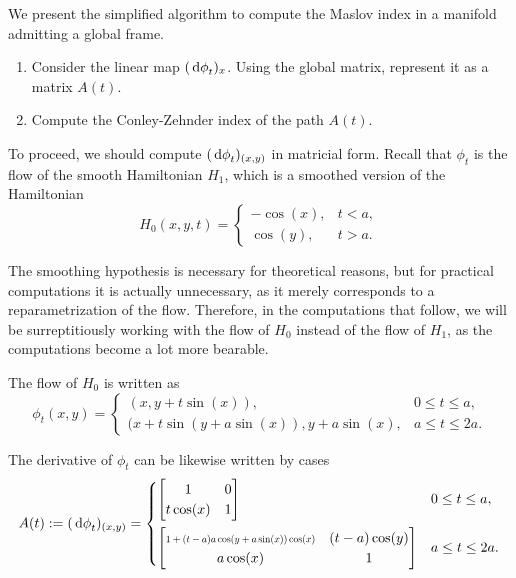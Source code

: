 \documentclass{article}
\theoremstyle{nonumberplain}
\begin{document}
We present the simplified algorithm to compute the Maslov index in a manifold admitting a global frame.
\begin{enumerate}[algorithm]\label{page:maslovalg2}
\item Consider the linear map $(\dl \phi_t)_x$. Using the global matrix, represent it as a matrix $A(t)$.
\item Compute the Conley-Zehnder index of the path $A(t)$.
\end{enumerate}

To proceed, we should compute $(\dl \phi_t)_{(x,y)}$ in matricial form. Recall that $\phi_t$ is the flow of the smooth Hamiltonian $H_1$, which is a smoothed version of the Hamiltonian
\begin{equation}
H_0(x,y,t) = \begin{cases}
-\cos(x), & t < a,\\
\cos(y), & t > a.
\end{cases}
\end{equation}

The smoothing hypothesis is necessary for theoretical reasons, but for practical computations it is actually unnecessary, as it merely corresponds to a reparametrization of the flow. Therefore, in the computations that follow, we will be surreptitiously working with the flow of $H_0$ instead of the flow of $H_1$, as the computations become a lot more bearable.

The flow of $H_0$ is written as
\begin{equation}
\phi_t(x,y) = \begin{cases}
(x,y+t \sin(x)), & 0 \leq t \leq a,\\
(x+t \sin(y+a \sin(x)), y + a \sin(x), & a \leq t \leq 2a.
\end{cases}
\end{equation}

The derivative of $\phi_t$ can be likewise written by cases
\begin{equation}\label{dphi1}
A(t) := (\dl \phi_t)_{(x,y)} = \begin{cases}
\begin{bmatrix}
1 & 0\\
t \cos(x) & 1
\end{bmatrix} & 0 \leq t \leq a,\\[1.3em]
\begin{bmatrix}
\scalebox{0.7}{$1+(t-a) a \cos(y+a \sin(x)) \cos(x)$} &  (t-a) \cos(y)\\
a \cos(x) & 1
\end{bmatrix}
 & a \leq t \leq 2a.
\end{cases}
\end{equation}
\end{document}
